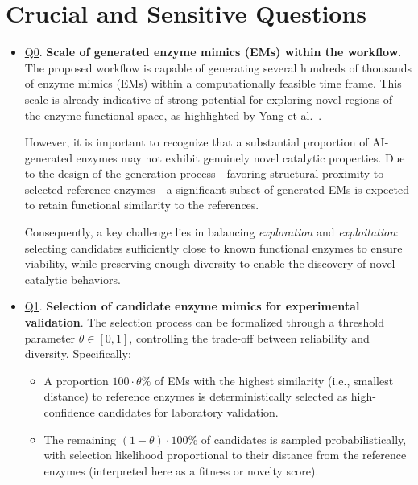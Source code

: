 \documentclass[runningheads]{llncs}
\begin{document}
	

 \section{Crucial and Sensitive Questions}
 
 \begin{itemize}
 	
 	\item \underline{Q0}. \textbf{Scale of generated enzyme mimics (EMs) within the workflow}.  
 	The proposed workflow is capable of generating several hundreds of thousands of enzyme mimics (EMs) within a computationally feasible time frame. This scale is already indicative of strong potential for exploring novel regions of the enzyme functional space, as highlighted by Yang et al.~\cite{yang2026}.  
 	
 	However, it is important to recognize that a substantial proportion of AI-generated enzymes may not exhibit genuinely novel catalytic properties. Due to the design of the generation process—favoring structural proximity to selected reference enzymes—a significant subset of generated EMs is expected to retain functional similarity to the references.  
 	
 	Consequently, a key challenge lies in balancing \emph{exploration} and \emph{exploitation}: selecting candidates sufficiently close to known functional enzymes to ensure viability, while preserving enough diversity to enable the discovery of novel catalytic behaviors.
 	
 	\vspace{0.3cm}
 	
 	\item \underline{Q1}. \textbf{Selection of candidate enzyme mimics for experimental validation}.  
 	The selection process can be formalized through a threshold parameter $\theta \in [0,1]$, controlling the trade-off between reliability and diversity. Specifically:
 	\begin{itemize}
 		\item A proportion $100 \cdot \theta\%$ of EMs with the highest similarity (i.e., smallest distance) to reference enzymes is deterministically selected as high-confidence candidates for laboratory validation.
 		\item The remaining $(1 - \theta)\cdot 100\%$ of candidates is sampled probabilistically, with selection likelihood proportional to their distance from the reference enzymes (interpreted here as a fitness or novelty score).
 	\end{itemize}
 	

\end{itemize}
\end{document}
